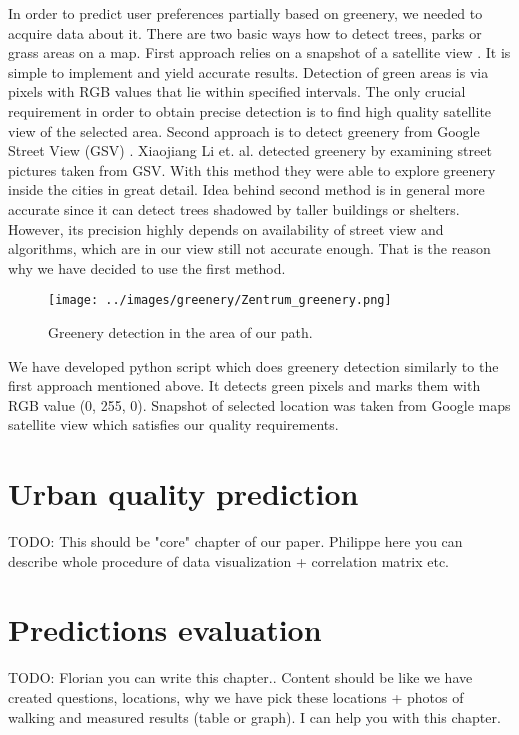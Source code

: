 \documentclass[letterpaper]{article}
\begin{document}
\indent In order to predict user preferences partially based on greenery, we needed to acquire data about it. There are two basic ways how to detect trees, parks or grass areas on a map. First approach relies on a snapshot of a satellite view \cite{smartCities}. It is simple to implement and yield accurate results. Detection of green areas is via pixels with RGB values that lie within specified intervals. The only crucial requirement in order to obtain precise detection is to find high quality satellite view of the selected area.
Second approach is to detect greenery from Google Street View (GSV) \cite{googleView}. Xiaojiang Li et. al. detected greenery by examining street
pictures taken from GSV. With this method they were able to explore greenery inside the cities in great detail. Idea behind second method is in general
more accurate since it can detect trees shadowed by taller buildings or shelters. However, its precision highly depends on availability of street view and
algorithms, which are in our view still not accurate enough. That is the reason why we have decided to use the first method.
 
  \begin{figure}
 	\centering
 	\texttt{[image: ../images/greenery/Zentrum\_greenery.png]}
 	\caption{Greenery detection in the area of our path.}
 	\label{fig:path_greenery}
 \end{figure}

\indent We have developed python script which does greenery detection similarly to the first approach mentioned above. It detects green pixels and marks them with RGB value (0, 255, 0). Snapshot of selected location was taken from Google maps satellite view which satisfies our quality requirements.  %
 
\section{Urban quality prediction}
TODO: This should be "core" chapter of our paper. Philippe here you can describe whole procedure of data visualization + correlation matrix etc.

\section{Predictions evaluation}\label{sec:exp}
TODO: Florian you can write this chapter.. Content should be like we have created questions, locations, why we have pick these locations + photos 
of walking and measured results (table or graph). I can help you with this chapter.
\end{document}
